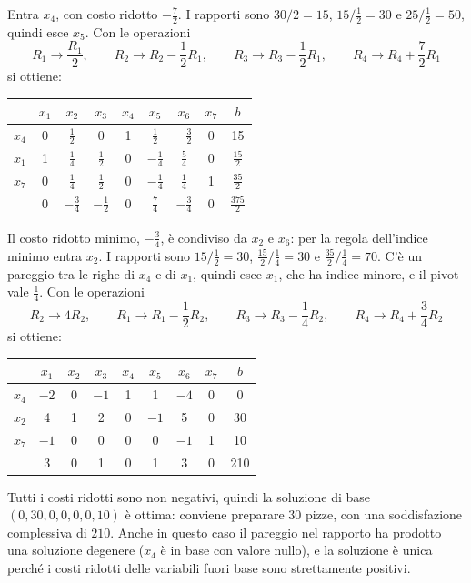 Entra $x_4$, con costo ridotto $-\frac72$. I rapporti sono $30/2 = 15$, $15/\frac12 = 30$ e $25/\frac12 = 50$, quindi esce $x_5$. Con le operazioni
\[
R_1 \to \frac{R_1}{2}, \qquad R_2 \to R_2 - \frac12 R_1, \qquad R_3 \to R_3 - \frac12 R_1, \qquad R_4 \to R_4 + \frac72 R_1
\]
si ottiene:
\begin{center}
\begin{tabular}{c|ccccccc|c}
 & $x_1$ & $x_2$ & $x_3$ & $x_4$ & $x_5$ & $x_6$ & $x_7$ & $b$ \\
\hline
$x_4$ & 0 & $\frac12$ & 0 & 1 & $\frac12$ & $-\frac32$ & 0 & 15 \\
$x_1$ & 1 & $\boxed{\tfrac14}$ & $\frac12$ & 0 & $-\frac14$ & $\frac54$ & 0 & $\frac{15}{2}$ \\
$x_7$ & 0 & $\frac14$ & $\frac12$ & 0 & $-\frac14$ & $\frac14$ & 1 & $\frac{35}{2}$ \\
\hline
 & 0 & $-\frac34$ & $-\frac12$ & 0 & $\frac74$ & $-\frac34$ & 0 & $\frac{375}{2}$ \\
\end{tabular}
\end{center}
Il costo ridotto minimo, $-\frac34$, è condiviso da $x_2$ e $x_6$: per la regola dell'indice minimo entra $x_2$. I rapporti sono $15/\frac12 = 30$, $\frac{15}{2}/\frac14 = 30$ e $\frac{35}{2}/\frac14 = 70$. C'è un pareggio tra le righe di $x_4$ e di $x_1$, quindi esce $x_1$, che ha indice minore, e il pivot vale $\frac14$. Con le operazioni
\[
R_2 \to 4R_2, \qquad R_1 \to R_1 - \frac12 R_2, \qquad R_3 \to R_3 - \frac14 R_2, \qquad R_4 \to R_4 + \frac34 R_2
\]
si ottiene:
\begin{center}
\begin{tabular}{c|ccccccc|c}
 & $x_1$ & $x_2$ & $x_3$ & $x_4$ & $x_5$ & $x_6$ & $x_7$ & $b$ \\
\hline
$x_4$ & $-2$ & 0 & $-1$ & 1 & 1 & $-4$ & 0 & 0 \\
$x_2$ & 4 & 1 & 2 & 0 & $-1$ & 5 & 0 & 30 \\
$x_7$ & $-1$ & 0 & 0 & 0 & 0 & $-1$ & 1 & 10 \\
\hline
 & 3 & 0 & 1 & 0 & 1 & 3 & 0 & 210 \\
\end{tabular}
\end{center}
Tutti i costi ridotti sono non negativi, quindi la soluzione di base $(0, 30, 0, 0, 0, 0, 10)$ è ottima: conviene preparare $30$ pizze, con una soddisfazione complessiva di $210$. Anche in questo caso il pareggio nel rapporto ha prodotto una soluzione degenere ($x_4$ è in base con valore nullo), e la soluzione è unica perché i costi ridotti delle variabili fuori base sono strettamente positivi.

